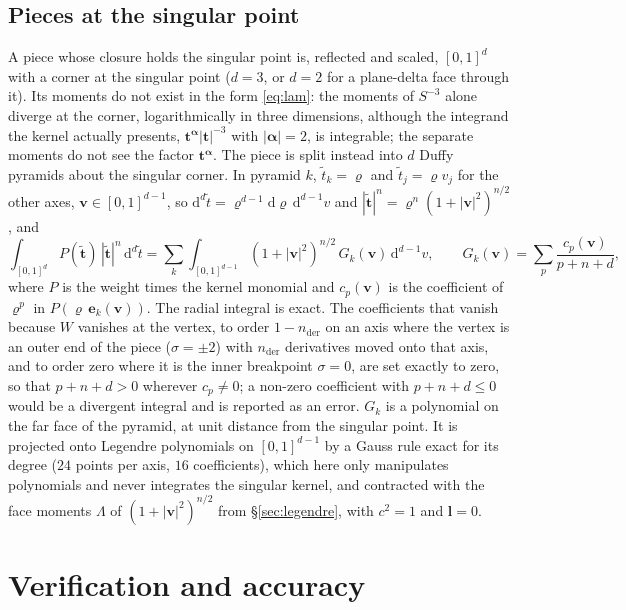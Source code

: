 \documentclass[11pt,a4paper]{article}
\newcommand{\bt}{\mathbf{t}}
\newcommand{\bv}{\mathbf{v}}
\newcommand{\balpha}{\boldsymbol{\alpha}}
\newcommand{\dd}{\mathrm{d}}
\begin{document}
\subsection{Pieces at the singular point}\label{sec:pyramids}

A piece whose closure holds the singular point is, reflected and scaled, $[0,1]^d$ with a corner at the
singular point ($d=3$, or $d=2$ for a plane-delta face through it). Its moments do not exist in the form
\eqref{eq:lam}: the moments of $S^{-3}$ alone diverge at the corner, logarithmically in three dimensions,
although the integrand the kernel actually presents, $\bt^{\balpha}|\bt|^{-3}$ with $|\balpha|=2$, is
integrable; the separate moments do not see the factor $\bt^{\balpha}$. The piece is split instead into $d$ Duffy pyramids about the singular corner.
In pyramid $k$, $\tilde t_k=\varrho$ and $\tilde t_j=\varrho v_j$ for the other axes, $\bv\in[0,1]^{d-1}$,
so $\dd^d\tilde t=\varrho^{d-1}\dd\varrho\,\dd^{d-1}v$ and $|\tilde{\bt}|^n=\varrho^n(1+|\bv|^2)^{n/2}$, and
\begin{equation}\label{eq:pyramid}
  \int_{[0,1]^d}P(\tilde{\bt})\,|\tilde{\bt}|^n\,\dd^d\tilde t
  =\sum_k\int_{[0,1]^{d-1}}(1+|\bv|^2)^{n/2}\,G_k(\bv)\,\dd^{d-1}v,\qquad
  G_k(\bv)=\sum_p\frac{c_p(\bv)}{p+n+d},
\end{equation}
where $P$ is the weight times the kernel monomial and $c_p(\bv)$ is the coefficient of $\varrho^p$ in
$P(\varrho\,\mathbf{e}_k(\bv))$. The radial integral is exact. The coefficients that vanish because $W$
vanishes at the vertex, to order $1-n_{\text{der}}$ on an axis where the vertex is an outer end of the
piece ($\sigma=\pm2$) with $n_{\text{der}}$ derivatives moved onto that axis, and to order zero where it is
the inner breakpoint $\sigma=0$, are set exactly to zero, so that $p+n+d>0$ wherever $c_p\ne0$; a non-zero
coefficient with $p+n+d\le0$ would be a divergent integral and is reported as an error. $G_k$ is a
polynomial on the far face of the pyramid, at unit distance from the singular point. It is projected onto
Legendre polynomials on $[0,1]^{d-1}$ by a Gauss rule exact for its degree ($24$ points per axis, $16$
coefficients), which here only manipulates polynomials and never integrates the singular kernel, and
contracted with the face moments $\Lambda$ of $(1+|\bv|^2)^{n/2}$ from \S\ref{sec:legendre}, with $c^2=1$
and $\mathbf{l}=0$.

\section{Verification and accuracy}\label{sec:results}
\end{document}
